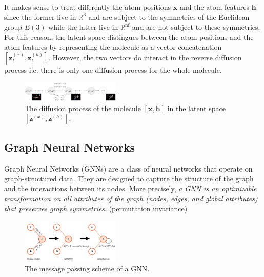\documentclass[sigconf]{acmart}
\begin{document}
It makes sense to treat differently the atom positions $\mathbf{x}$ and the atom features $\mathbf{h}$ since the former live in $\mathbb{R}^3$ and are subject to the symmetries of the Euclidean group $E(3)$ while the latter live in $\mathbb{R}^\text{nf}$ and are not subject to these symmetries.
For this reason, the latent space distingues between the atom positions and the atom features by representing the molecule as a vector concatenation $\left[ \mathbf{z}^{(x)}_t, \mathbf{z}^{(h)}_t \right]$.
However, the two vectors do interact in the reverse diffusion process i.e. there is only one diffusion process for the whole molecule.

\begin{figure}
    \centering
    \includegraphics[width=0.42\textwidth]{figures/diffusion.png}
    \caption{The diffusion process of the molecule $\left[ \mathbf{x}, \mathbf{h} \right]$ in the latent space $\left[ \mathbf{z}^{(x)}, \mathbf{z}^{(h)} \right]$.}
    \label{fig:diffusion}
\end{figure}

\subsection{Graph Neural Networks}
Graph Neural Networks (GNNs) are a class of neural networks that operate on graph-structured data.
They are designed to capture the structure of the graph and the interactions between its nodes.
More precisely, \textit{a GNN is an optimizable transformation on all attributes of the graph (nodes, edges, and global attributes) 
that preserves graph symmetries}. (permutation invariance) \cite{gentle-intro-GNN}

\begin{figure}
    \centering
    \includegraphics[width=0.42\textwidth]{figures/message_passing.png}
    \caption{The message passing scheme of a GNN.}
    \label{fig:message-passing}
\end{figure}
\end{document}
